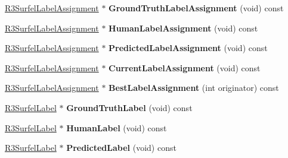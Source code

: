 \begin{DoxyCompactItemize}
\item 
\hyperlink{class_r3_surfel_label_assignment}{R3\+Surfel\+Label\+Assignment} $\ast$ {\bfseries Ground\+Truth\+Label\+Assignment} (void) const \hypertarget{class_r3_surfel_object_a38db76ad1d4bcf35e8f4073215278b81}{}\label{class_r3_surfel_object_a38db76ad1d4bcf35e8f4073215278b81}

\item 
\hyperlink{class_r3_surfel_label_assignment}{R3\+Surfel\+Label\+Assignment} $\ast$ {\bfseries Human\+Label\+Assignment} (void) const \hypertarget{class_r3_surfel_object_a7ec97bf4a0f9c33c413b51f27a9945dc}{}\label{class_r3_surfel_object_a7ec97bf4a0f9c33c413b51f27a9945dc}

\item 
\hyperlink{class_r3_surfel_label_assignment}{R3\+Surfel\+Label\+Assignment} $\ast$ {\bfseries Predicted\+Label\+Assignment} (void) const \hypertarget{class_r3_surfel_object_a5263baa5813f307f3e811255a2f6ad11}{}\label{class_r3_surfel_object_a5263baa5813f307f3e811255a2f6ad11}

\item 
\hyperlink{class_r3_surfel_label_assignment}{R3\+Surfel\+Label\+Assignment} $\ast$ {\bfseries Current\+Label\+Assignment} (void) const \hypertarget{class_r3_surfel_object_ab7280dfcb43fd88739a15592a9c80153}{}\label{class_r3_surfel_object_ab7280dfcb43fd88739a15592a9c80153}

\item 
\hyperlink{class_r3_surfel_label_assignment}{R3\+Surfel\+Label\+Assignment} $\ast$ {\bfseries Best\+Label\+Assignment} (int originator) const \hypertarget{class_r3_surfel_object_a21a4778ad44350b9ba02d4ac50214b35}{}\label{class_r3_surfel_object_a21a4778ad44350b9ba02d4ac50214b35}

\item 
\hyperlink{class_r3_surfel_label}{R3\+Surfel\+Label} $\ast$ {\bfseries Ground\+Truth\+Label} (void) const \hypertarget{class_r3_surfel_object_aadd9d6fb655b264d92cac44be23754b0}{}\label{class_r3_surfel_object_aadd9d6fb655b264d92cac44be23754b0}

\item 
\hyperlink{class_r3_surfel_label}{R3\+Surfel\+Label} $\ast$ {\bfseries Human\+Label} (void) const \hypertarget{class_r3_surfel_object_ab0f0c2a41df190851e1682eb0d20e3b3}{}\label{class_r3_surfel_object_ab0f0c2a41df190851e1682eb0d20e3b3}

\item 
\hyperlink{class_r3_surfel_label}{R3\+Surfel\+Label} $\ast$ {\bfseries Predicted\+Label} (void) const \hypertarget{class_r3_surfel_object_ab5e582ada52ce9f0bce8b84613bc5ef2}{}\label{class_r3_surfel_object_ab5e582ada52ce9f0bce8b84613bc5ef2}


\end{DoxyCompactItemize}
